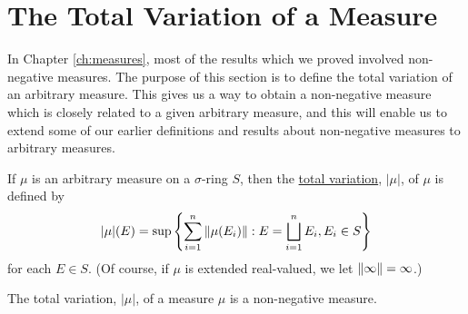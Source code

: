 \section{The Total Variation of a Measure}

In Chapter \ref{ch:measures}, most of the results which we proved involved non-negative measures. The purpose of this section is to define the total variation of an arbitrary measure. This gives us a way to obtain a non-negative measure which is closely related to a given arbitrary measure, and this will enable us to extend some of our earlier definitions and results about non-negative measures to arbitrary measures.

\begin{definition}
If $\mu$ is an arbitrary measure on a $\sigma$-ring $S$, then the \underline{total variation}, $|\mu|$, of $\mu$ is defined by $$|\mu|(E)=\sup\left\{\sum_{i=1}^n\norm{\mu(E_i)}: E=\bigsqcup_{i=1}^nE_i, E_i\in S\right\}$$ for each $E \in S$. (Of course, if $\mu$ is extended real-valued, we let $\norm{\infty}=\infty$.)
\end{definition}


\begin{theorem}
\label{thm:total var is measure}
The total variation, $|\mu|$, of a measure $\mu$ is a non-negative measure.
\end{theorem}

